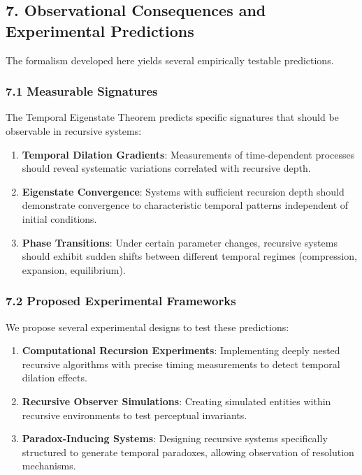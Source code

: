 \documentclass[
]{article}
\begin{document}
\subsection{7. Observational Consequences and Experimental
Predictions}\label{observational-consequences-and-experimental-predictions}

The formalism developed here yields several empirically testable
predictions.

\subsubsection{7.1 Measurable Signatures}\label{measurable-signatures}

The Temporal Eigenstate Theorem predicts specific signatures that should
be observable in recursive systems:

\begin{enumerate}
\def\labelenumi{\arabic{enumi}.}
\item
  \textbf{Temporal Dilation Gradients}: Measurements of time-dependent
  processes should reveal systematic variations correlated with
  recursive depth.
\item
  \textbf{Eigenstate Convergence}: Systems with sufficient recursion
  depth should demonstrate convergence to characteristic temporal
  patterns independent of initial conditions.
\item
  \textbf{Phase Transitions}: Under certain parameter changes, recursive
  systems should exhibit sudden shifts between different temporal
  regimes (compression, expansion, equilibrium).
\end{enumerate}

\subsubsection{7.2 Proposed Experimental
Frameworks}\label{proposed-experimental-frameworks}

We propose several experimental designs to test these predictions:

\begin{enumerate}
\def\labelenumi{\arabic{enumi}.}
\item
  \textbf{Computational Recursion Experiments}: Implementing deeply
  nested recursive algorithms with precise timing measurements to detect
  temporal dilation effects.
\item
  \textbf{Recursive Observer Simulations}: Creating simulated entities
  within recursive environments to test perceptual invariants.
\item
  \textbf{Paradox-Inducing Systems}: Designing recursive systems
  specifically structured to generate temporal paradoxes, allowing
  observation of resolution mechanisms.
\end{enumerate}
\end{document}
